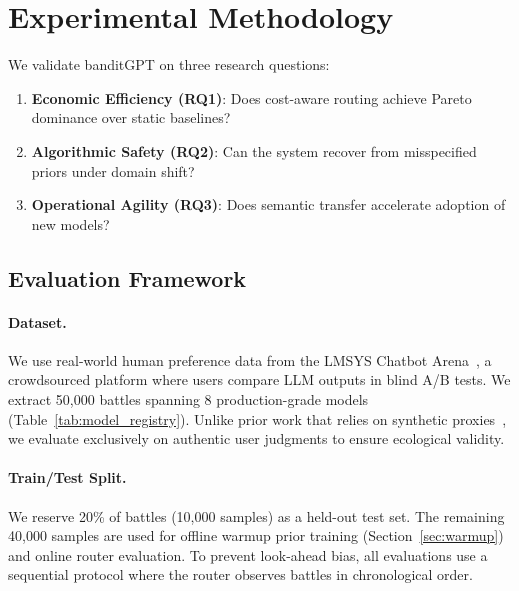 
\section{Experimental Methodology}
\label{sec:experiments}

We validate banditGPT on three research questions:
\begin{enumerate}[leftmargin=*, itemsep=2pt]
    \item \textbf{Economic Efficiency (RQ1)}: Does cost-aware routing achieve Pareto dominance over static baselines?
    \item \textbf{Algorithmic Safety (RQ2)}: Can the system recover from misspecified priors under domain shift?
    \item \textbf{Operational Agility (RQ3)}: Does semantic transfer accelerate adoption of new models?
\end{enumerate}

\subsection{Evaluation Framework}

\paragraph{Dataset.}
We use real-world human preference data from the LMSYS Chatbot Arena~\cite{zheng2023judging}, a crowdsourced platform where users compare LLM outputs in blind A/B tests. We extract 50,000 battles spanning 8 production-grade models (Table~\ref{tab:model_registry}). Unlike prior work that relies on synthetic proxies~\cite{ong2024routellm}, we evaluate exclusively on authentic user judgments to ensure ecological validity.

\paragraph{Train/Test Split.}
We reserve 20\% of battles (10,000 samples) as a held-out test set. The remaining 40,000 samples are used for offline warmup prior training (Section~\ref{sec:warmup}) and online router evaluation. To prevent look-ahead bias, all evaluations use a sequential protocol where the router observes battles in chronological order.

